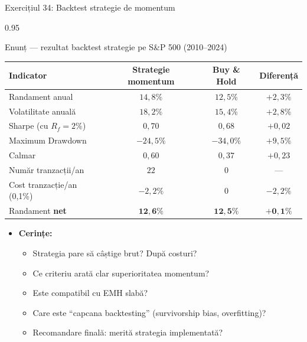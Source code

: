 \documentclass[9pt, aspectratio=169, t]{beamer}
\begin{document}
\begin{frame}[shrink=25]{Exercițiul 34: Backtest strategie de momentum}
\begin{cminipage}{0.95\textwidth}
\begin{block}{Enunț --- rezultat backtest strategie pe S\&P 500 (2010--2024)}
\small
\renewcommand{\arraystretch}{1.2}
\begin{center}
\begin{tabular}{lccc}
\toprule
\textbf{Indicator} & \textbf{Strategie momentum} & \textbf{Buy \& Hold} & \textbf{Diferență} \\
\midrule
Randament anual & $14{,}8\%$ & $12{,}5\%$ & $+2{,}3\%$ \\
Volatilitate anuală & $18{,}2\%$ & $15{,}4\%$ & $+2{,}8\%$ \\
Sharpe (cu $R_f = 2\%$) & $0{,}70$ & $0{,}68$ & $+0{,}02$ \\
Maximum Drawdown & $-24{,}5\%$ & $-34{,}0\%$ & $+9{,}5\%$ \\
Calmar & $0{,}60$ & $0{,}37$ & $+0{,}23$ \\
Număr tranzacții/an & $22$ & $0$ & --- \\
Cost tranzacție/an (0,1\%) & $-2{,}2\%$ & $0$ & $-2{,}2\%$ \\
Randament \textbf{net} & $\mathbf{12{,}6\%}$ & $\mathbf{12{,}5\%}$ & $\mathbf{+0{,}1\%}$ \\
\bottomrule
\end{tabular}
\end{center}
\end{block}
\begin{itemize}\setlength{\itemsep}{0pt}
    \item \textbf{Cerințe:}
    \begin{itemize}\setlength{\itemsep}{0pt}
        \item Strategia pare să câștige brut? După costuri?
        \item Ce criteriu arată clar superioritatea momentum?
        \item Este compatibil cu EMH slabă?
        \item Care este ``capcana backtesting'' (survivorship bias, overfitting)?
        \item Recomandare finală: merită strategia implementată?
    \end{itemize}
\end{itemize}
\end{cminipage}
\end{frame}
\end{document}
